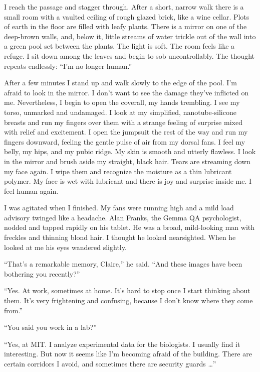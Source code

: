 \documentclass[10pt,b5paper]{article}
\begin{document}
I reach the passage and stagger through.  After a short, narrow walk
there is a small room with a vaulted ceiling of rough glazed brick,
like a wine cellar. Plots of earth in the floor are filled with leafy
plants. There is a mirror on one of the deep-brown walls, and, below
it, little streams of water trickle out of the wall into a green pool
set between the plants.  The light is soft. The room feels like a
refuge. I sit down among the leaves and begin to sob uncontrollably.
The thought repeats endlessly: ``I'm no longer human.''

After a few minutes I stand up and walk slowly to the edge of the pool.
I'm afraid to look in the mirror. I don't want to see the damage
they've inflicted on me. Nevertheless, I begin to open the coverall,
my hands trembling.  I see my torso, unmarked and undamaged. I look at
my simplified, nanotube-silicone breasts and run my fingers over them
with a strange feeling of surprise mixed with relief and excitement. I
open the jumpsuit the rest of the way and run my fingers downward,
feeling the gentle pulse of air from my dorsal fans. I feel my belly,
my hips, and my pubic ridge. My skin is smooth and utterly flawless. I
look in the mirror and brush aside my straight, black hair. Tears are
streaming down my face again. I wipe them and recognize the moisture
as a thin lubricant polymer. My face is wet with lubricant and there
is joy and surprise inside me. I feel human again.

\bigskip

I was agitated when I finished. My fans were running high and a mild
load advisory twinged like a headache.  Alan Franks, the Gemma QA
psychologist, nodded and tapped rapidly on his tablet. He was a broad,
mild-looking man with freckles and thinning blond hair. I thought he
looked nearsighted. When he looked at me his eyes wandered slightly.

``That's a remarkable memory, Claire,'' he said. ``And these images
have been bothering you recently?''

``Yes. At work, sometimes at home. It's hard to stop once I start
thinking about them. It's very frightening and confusing, because I
don't know where they come from.''

``You said you work in a lab?''

``Yes, at MIT. I analyze experimental data for the biologists. I
usually find it interesting. But now it seems like I'm becoming afraid
of the building. There are certain corridors I avoid, and sometimes
there are security guards \ldots''
\end{document}
